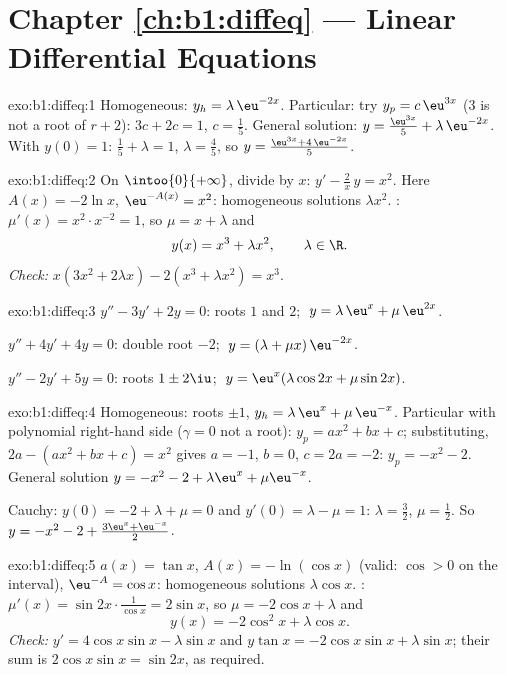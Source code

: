 \section*{Chapter \ref{ch:b1:diffeq} --- Linear Differential Equations}

\begin{solution}{exo:b1:diffeq:1}
Homogeneous: $y_h = \lambda\,\eu^{-2x}$. Particular: try $y_p =
c\,\eu^{3x}$ ($3$ is not a root of $r + 2$): $3c + 2c = 1$, $c =
\frac15$. General solution: $y = \frac{\eu^{3x}}{5} +
\lambda\,\eu^{-2x}$. With $y(0) = 1$: $\frac15 + \lambda = 1$,
$\lambda = \frac45$, so $y = \frac{\eu^{3x} + 4\,\eu^{-2x}}{5}$.
\end{solution}

\begin{solution}{exo:b1:diffeq:2}
On $\intoo{0}{+\infty}$, divide by $x$: $y' - \frac{2}{x}\,y = x^2$.
Here $A(x) = -2\ln x$, $\eu^{-A(x)} = x^2$: homogeneous solutions
$\lambda x^2$. : $\mu'(x) = x^2 \cdot x^{-2} =
1$, so $\mu = x + \lambda$ and
\[
y(x) = x^3 + \lambda x^2, \qquad \lambda \in \R .
\]
\emph{Check:} $x(3x^2 + 2\lambda x) - 2(x^3 + \lambda x^2) = x^3$.
\end{solution}

\begin{solution}{exo:b1:diffeq:3}
$y'' - 3y' + 2y = 0$: roots $1$ and $2$; $\;y = \lambda\,\eu^{x} +
\mu\,\eu^{2x}$.

$y'' + 4y' + 4y = 0$: double root $-2$; $\;y = (\lambda + \mu
x)\,\eu^{-2x}$.

$y'' - 2y' + 5y = 0$: roots $1 \pm 2\iu$; $\;y = \eu^{x}(\lambda\cos
2x + \mu\sin 2x)$.
\end{solution}

\begin{solution}{exo:b1:diffeq:4}
Homogeneous: roots $\pm 1$, $y_h = \lambda\,\eu^x + \mu\,\eu^{-x}$.
Particular with polynomial right-hand side ($\gamma = 0$ not a root):
$y_p = ax^2 + bx + c$; substituting, $2a - (ax^2 + bx + c) = x^2$
gives $a = -1$, $b = 0$, $c = 2a = -2$: $y_p = -x^2 - 2$. General
solution $y = -x^2 - 2 + \lambda\eu^x + \mu\eu^{-x}$.

Cauchy: $y(0) = -2 + \lambda + \mu = 0$ and $y'(0) = \lambda - \mu =
1$: $\lambda = \frac32$, $\mu = \frac12$. So
$y = -x^2 - 2 + \frac{3\eu^x + \eu^{-x}}{2}$.
\end{solution}

\begin{solution}{exo:b1:diffeq:5}
$a(x) = \tan x$, $A(x) = -\ln(\cos x)$ (valid: $\cos > 0$ on the
interval), $\eu^{-A} = \cos x$: homogeneous solutions $\lambda\cos x$.
: $\mu'(x) = \sin 2x \cdot \frac{1}{\cos x} =
2\sin x$, so $\mu = -2\cos x + \lambda$ and
\[
y(x) = -2\cos^2 x + \lambda \cos x .
\]
\emph{Check:} $y' = 4\cos x \sin x - \lambda\sin x$ and $y\tan x =
-2\cos x\sin x + \lambda \sin x$; their sum is $2\cos x\sin x =
\sin 2x$, as required.
\end{solution}

